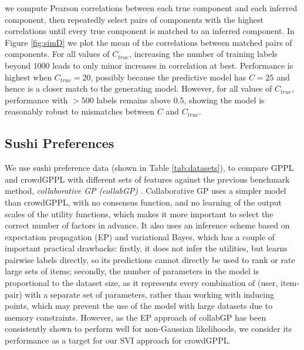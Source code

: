 we compute Pearson correlations between each
true component and each inferred component, then repeatedly select pairs of components with the highest correlations
 until every true component is matched to an inferred component. 
In Figure \ref{fig:simD} we plot the mean of the correlations between matched pairs of components.
For all values of $C_{true}$, increasing the
number of training labels beyond $1000$ leads to only minor increases in correlation at best. 
Performance is highest when $C_{true} = 20$,
possibly because the predictive model has $C = 25$
and hence is a closer match to the generating model.
However, for all values of $C_{true}$, performance with $>500$ labels remains above 0.5,
 showing the model is reasonably robust
to mismatches between $C$ and $C_{true}$.


\subsection{Sushi Preferences}\label{sec:sushi}

We use sushi preference data (shown in Table \ref{tab:datasets}),
to compare GPPL and crowdGPPL with different sets of features
against the previous benchmark method, \emph{collaborative GP (collabGP)} \citep{houlsby2012collaborative}.
Collaborative GP uses a simpler model than crowdGPPL, with no consensus function, and no learning of the 
output scales of the utility functions, which makes it more important to select the correct number of factors in advance.
It also uses an inference scheme based on expectation propagation (EP)
 and variational Bayes, which has a couple of important
  practical drawbacks:
  firstly, it does not infer the utilities, but learns pairwise labels directly, so its predictions cannot 
  directly be used to
  rank or rate large sets of items; 
  secondly, the number of parameters in the model is proportional to the dataset size, 
  as it represents every combination of
  (user, item-pair) with a separate set of parameters, rather than working with inducing points,
  which may prevent the use of the model with large datasets due to memory constraints.
However, as the EP approach of collabGP has been consistently shown to perform well for non-Gaussian likelihoods\citep{?},
we consider its performance as a target for our SVI approach for crowdGPPL.

